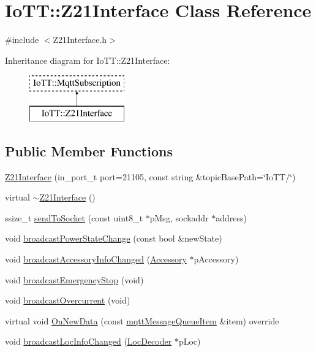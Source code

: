 \hypertarget{classIoTT_1_1Z21Interface}{}\section{Io\+TT\+:\+:Z21\+Interface Class Reference}
\label{classIoTT_1_1Z21Interface}


{\ttfamily \#include $<$Z21\+Interface.\+h$>$}

Inheritance diagram for Io\+TT\+:\+:Z21\+Interface\+:\begin{figure}[H]
\begin{center}
\leavevmode
\includegraphics[height=2.000000cm]{classIoTT_1_1Z21Interface}
\end{center}
\end{figure}
\subsection*{Public Member Functions}
\begin{DoxyCompactItemize}
\item 
\hyperlink{classIoTT_1_1Z21Interface_a10d5e45be47f7d9a17567d12bb5db2d3}{Z21\+Interface} (in\+\_\+port\+\_\+t port=21105, const string \&topic\+Base\+Path=\char`\"{}Io\+TT/\char`\"{})
\item 
virtual \hyperlink{classIoTT_1_1Z21Interface_a49ba7d835312d0f11bc61143410cf373}{$\sim$\+Z21\+Interface} ()
\item 
ssize\+\_\+t \hyperlink{classIoTT_1_1Z21Interface_a94dfc1d0b95d6217912c04127dba95f2}{send\+To\+Socket} (const uint8\+\_\+t $\ast$p\+Msg, sockaddr $\ast$address)
\item 
void \hyperlink{classIoTT_1_1Z21Interface_aacab731304b340d69606b397a62a83aa}{broadcast\+Power\+State\+Change} (const bool \&new\+State)
\item 
void \hyperlink{classIoTT_1_1Z21Interface_a64204cc5a7b4a99e1d6f70c28139cb06}{broadcast\+Accessory\+Info\+Changed} (\hyperlink{classIoTT_1_1Accessory}{Accessory} $\ast$p\+Accessory)
\item 
void \hyperlink{classIoTT_1_1Z21Interface_aee490b2f7934a38f04dbc88708e89285}{broadcast\+Emergency\+Stop} (void)
\item 
void \hyperlink{classIoTT_1_1Z21Interface_a55b1ca4967ca8e7771f06789e9672cfa}{broadcast\+Overcurrent} (void)
\item 
virtual void \hyperlink{classIoTT_1_1Z21Interface_adcb6084a5d89a8fb1f32fdb81009a90e}{On\+New\+Data} (const \hyperlink{classIoTT_1_1mqttMessageQueueItem}{mqtt\+Message\+Queue\+Item} \&item) override
\item 
void \hyperlink{classIoTT_1_1Z21Interface_a74bcabc2f7aef6df8a10b12ddf924c20}{broadcast\+Loc\+Info\+Changed} (\hyperlink{classIoTT_1_1LocDecoder}{Loc\+Decoder} $\ast$p\+Loc)
\end{DoxyCompactItemize}

